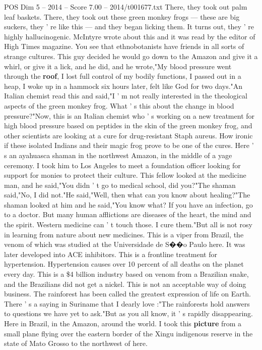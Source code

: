 \begin{textsample}{POS Dim 5 – 2014 – Score 7.00 – 2014/t001677.txt}
There, they took out palm leaf baskets.
There, they took out these green monkey frogs — these are big suckers, they ' re like this — and they began licking them.
It turns out, they ' re highly hallucinogenic.
McIntyre wrote about this and it was read by the editor of High Times magazine.
You see that ethnobotanists have friends in all sorts of strange cultures.
This guy decided he would go down to the Amazon and give it a whirl, or give it a lick, and he did, and he wrote,"My blood pressure went through the \textbf{roof}, I lost full control of my bodily functions, I passed out in a heap, I woke up in a hammock six hours later, felt like God for two days."An Italian chemist read this and said,"I ' m not really interested in the theological aspects of the green monkey frog.
What ' s this about the change in blood pressure?"Now, this is an Italian chemist who ' s working on a new treatment for high blood pressure based on peptides in the skin of the green monkey frog, and other scientists are looking at a cure for drug-resistant Staph aureus.
How ironic if these isolated Indians and their magic frog prove to be one of the cures.
Here ' s an ayahuasca shaman in the northwest Amazon, in the middle of a yage ceremony.
I took him to Los Angeles to meet a foundation officer looking for support for monies to protect their culture.
This fellow looked at the medicine man, and he said,"You didn ' t go to medical school, did you?"The shaman said,"No, I did not."He said,"Well, then what can you know about healing?"The shaman looked at him and he said,"You know what?
If you have an infection, go to a doctor.
But many human afflictions are diseases of the heart, the mind and the spirit.
Western medicine can ' t touch those.
I cure them."But all is not rosy in learning from nature about new medicines.
This is a viper from Brazil, the venom of which was studied at the Universidade de S{\EmojiFont �}{\EmojiFont �}o Paulo here.
It was later developed into ACE inhibitors.
This is a frontline treatment for hypertension.
Hypertension causes over 10 percent of all deaths on the planet every day.
This is a \$4 billion industry based on venom from a Brazilian snake, and the Brazilians did not get a nickel.
This is not an acceptable way of doing business.
The rainforest has been called the greatest expression of life on Earth.
There ' s a saying in Suriname that I dearly love :"The rainforests hold answers to questions we have yet to ask."But as you all know, it ' s rapidly disappearing.
Here in Brazil, in the Amazon, around the world.
I took this \textbf{picture} from a small plane flying over the eastern border of the Xingu indigenous reserve in the state of Mato Grosso to the northwest of here.

\end{textsample}
